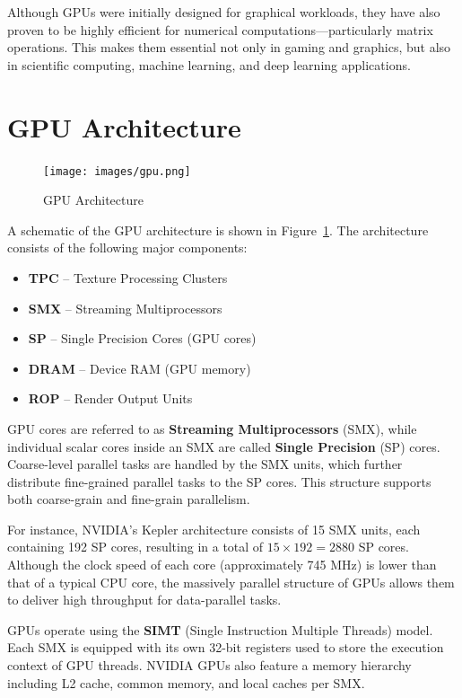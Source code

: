 \documentclass[12pt]{book}
\begin{document}
Although GPUs were initially designed for graphical workloads, they have also proven to be highly efficient for numerical computations—particularly matrix operations. This makes them essential not only in gaming and graphics, but also in scientific computing, machine learning, and deep learning applications.


\section{GPU Architecture}

\begin{figure}[H]
    \centering
    \texttt{[image: images/gpu.png]}
    \caption{GPU Architecture}
    \label{fig:gpu}
\end{figure}

A schematic of the GPU architecture is shown in Figure~\ref{fig:gpu}. The architecture consists of the following major components:
\begin{itemize}
    \item \textbf{TPC} – Texture Processing Clusters
    \item \textbf{SMX} – Streaming Multiprocessors
    \item \textbf{SP} – Single Precision Cores (GPU cores)
    \item \textbf{DRAM} – Device RAM (GPU memory)
    \item \textbf{ROP} – Render Output Units
\end{itemize}

GPU cores are referred to as \textbf{Streaming Multiprocessors} (SMX), while individual scalar cores inside an SMX are called \textbf{Single Precision} (SP) cores. Coarse-level parallel tasks are handled by the SMX units, which further distribute fine-grained parallel tasks to the SP cores. This structure supports both coarse-grain and fine-grain parallelism.

For instance, NVIDIA's Kepler architecture consists of 15 SMX units, each containing 192 SP cores, resulting in a total of $15 \times 192 = 2880$ SP cores. Although the clock speed of each core (approximately 745 MHz) is lower than that of a typical CPU core, the massively parallel structure of GPUs allows them to deliver high throughput for data-parallel tasks.

GPUs operate using the \textbf{SIMT} (Single Instruction Multiple Threads) model. Each SMX is equipped with its own 32-bit registers used to store the execution context of GPU threads. NVIDIA GPUs also feature a memory hierarchy including L2 cache, common memory, and local caches per SMX.
\end{document}
